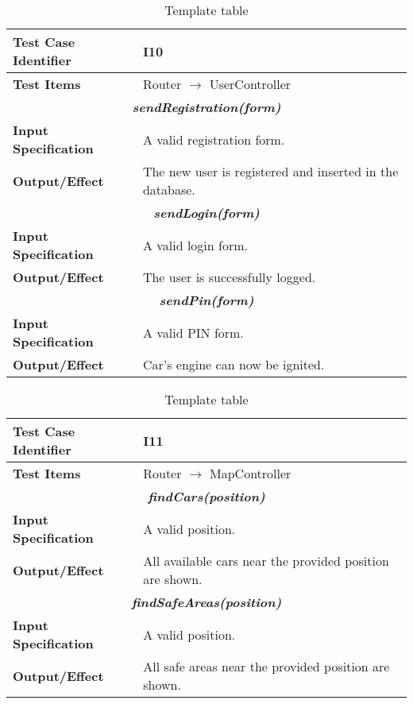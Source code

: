 \begin{table}[h]
	\begin{tabularx}{\textwidth}{l X}
		\hline
		\textbf{Test Case Identifier}	&	I10\\	\hline
		\textbf{Test Items}			&	Router $\rightarrow$ UserController \\	\hline\hline
		\multicolumn{2}{c}{\textbf{\textit{sendRegistration(form)}}}	\\	\hline
			\textbf{Input Specification}	&	A valid registration form.\\	\hline
			\textbf{Output/Effect}	&	The new user is registered and inserted in the database.\\	\hline\hline
		\multicolumn{2}{c}{\textbf{\textit{sendLogin(form)}}}	\\	\hline
			\textbf{Input Specification}	&	A valid login form.\\	\hline
			\textbf{Output/Effect}	&	The user is successfully logged.\\	\hline\hline
		\multicolumn{2}{c}{\textbf{\textit{sendPin(form)}}}	\\	\hline
			\textbf{Input Specification}	&	A valid PIN form.\\	\hline
			\textbf{Output/Effect}	&	Car's engine can now be ignited.\\	\hline\hline
	\end{tabularx}
	\captionsetup{textformat=empty,labelformat=blank}
	\caption{Template table}
	\label{table:template-table}
\end{table}

\begin{table}[h]
	\begin{tabularx}{\textwidth}{l X}
		\hline
		\textbf{Test Case Identifier}	&	I11\\	\hline
		\textbf{Test Items}			&	Router $\rightarrow$ MapController \\	\hline\hline
		\multicolumn{2}{c}{\textbf{\textit{findCars(position)}}}	\\	\hline
			\textbf{Input Specification}	&	A valid position.\\	\hline
			\textbf{Output/Effect}	&	All available cars near the provided position are shown.\\	\hline\hline
		\multicolumn{2}{c}{\textbf{\textit{findSafeAreas(position)}}}	\\	\hline
			\textbf{Input Specification}	&	A valid position.\\	\hline
			\textbf{Output/Effect}	&	All safe areas near the provided position are shown.\\	\hline\hline
	\end{tabularx}
	\captionsetup{textformat=empty,labelformat=blank}
	\caption{Template table}
	\label{table:template-table}
\end{table}

